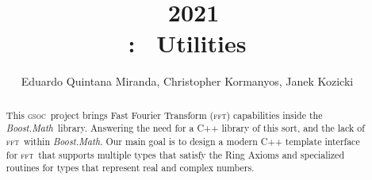 \documentclass[11pt,a4paper]{article}
\title{\gsoc\ 2021\\\boostmath: \fft\ Utilities}
\author{Eduardo Quintana Miranda, Christopher Kormanyos, Janek Kozicki}
\newcommand{\fft}{\textsc{fft}}
\newcommand{\gsoc}{\textsc{gsoc}}
\newcommand{\boostmath}{\textit{Boost.Math}}
\begin{document}
\maketitle
\begin{abstract}
This \gsoc\ project brings Fast Fourier Transform (\fft) capabilities
inside the \boostmath\ library. Answering the need for a C++ library
of this sort, and the lack of \fft\ within \boostmath.
Our main goal is to design a modern C++ template interface for \fft\
that supports multiple types that satisfy the Ring Axioms and specialized
routines for types that represent real and complex numbers.
\end{abstract}

\tableofcontents








    


\appendix

\end{document}
